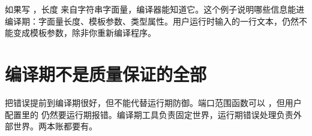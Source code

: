 如果写 ，长度  来自字符串字面量，编译器能知道它。这个例子说明哪些信息能进编译期：字面量长度、模板参数、类型属性。用户运行时输入的一行文本，仍然不能变成模板参数，除非你重新编译程序。

\section{编译期不是质量保证的全部}

把错误提前到编译期很好，但不能代替运行期防御。端口范围函数可以 ，但用户配置里的  仍然要运行期报错。编译期工具负责固定世界，运行期错误处理负责外部世界。两本账都要有。
